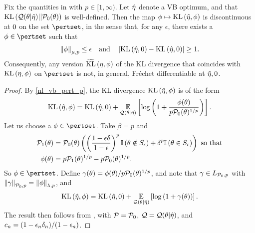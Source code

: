 %
\begin{thm}
%
Fix the quantities in  with $p \in [1, \infty)$.  Let
$\hat\eta$ denote a VB optimum, and that $\mathrm{KL}\left(\mathcal{Q}(\theta \vert \hat\eta) ||
\mathcal{P}_{0}(\theta)\right)$ is well-defined. Then the map $\phi \mapsto \mathrm{KL}\left(\hat\eta, \phi\right)$
is discontinuous at $0$ on the set $\pertset$, in the sense that, for any
$\epsilon$, there exists a $\phi \in \pertset$ such that
%
\begin{align*}
%
\norm{\phi}_{\mu,p} \le \epsilon \mathand
\abs{\KL{\etaopt, \phiz} - \KL{\etaopt, \phiz}} \ge 1.
%
\end{align*}
%
Consequently, any version $\widetilde{\mathrm{KL}}\left(\eta, \phi\right)$ of the KL divergence that
coincides with $\mathrm{KL}\left(\eta, \phi\right)$ on $\pertset$ is not, in general, Fr{\'e}chet
differentiable at $\hat\eta, 0$.
%
\begin{proof}
%

By \eqref{nl_vb_pert_p}, the KL divergence $\mathrm{KL}\left(\hat\eta, \phi\right)$ is of the form
%
\begin{align*}
%
\KL{\etaopt, \phi} = \KL{\etaopt, \phiz} +
\expect{\q(\theta \vert \etaopt)}{
    \log\left(1 + \frac{\phi(\theta)}{p \pbase(\theta)^{1/p}}\right)
}.
%
\end{align*}
%
Let us choose a $\phi \in \pertset$.  Take $\beta = p$ and
%
\begin{align*}
%
\palt(\theta) ={}&
    \pbase(\theta)\left(
        \left( \frac{1 - \epsilon\delta}{1 - \epsilon}\right)^{p}
        \ind{\theta \notin S_{\epsilon}} +
        \delta^{p} \ind{\theta \in S_{\epsilon}}
    \right) \textrm{ so that}
\\
\phi(\theta) ={}& p \palt(\theta)^{1/p} - p \pbase(\theta)^{1/p}.
%
\end{align*}
%
So $\phi \in \pertset$.  Define $\gamma(\theta) = \phi(\theta) /
p \mathcal{P}_{0}(\theta)^{1/p}$, and note that $\gamma \in {L_{\mathcal{P}_{0}, p}}$ with
$\left\Vert\gamma\right\Vert_{\mathcal{P}_{0}, p} = \left\Vert\phi\right\Vert_{\lambda, p}$, and
%
\begin{align*}
%
\KL{\etaopt, \phi} = \KL{\etaopt, \phiz} +
\expect{\q(\theta \vert \etaopt)}{\log\left(1 + \gamma(\theta)\right)}.
%
\end{align*}
%
The result then follows from , with $\mathcal{P} =
\mathcal{P}_{0}$,  $\mathcal{Q} = \mathcal{Q}(\theta \vert \hat\eta)$, and $c_n = (1 - \epsilon_n \delta_n) /
(1 - \epsilon_n)$.
%
\end{proof}
%
\end{thm}

